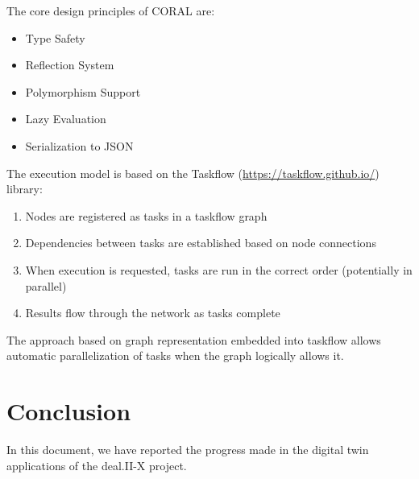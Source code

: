 \documentclass[a4paper,12pt]{article}
\begin{document}
The core design principles of CORAL are:
\begin{itemize}
  \item Type Safety
  \item Reflection System
  \item Polymorphism Support
  \item Lazy Evaluation
  \item Serialization to JSON
\end{itemize}

The execution model is based on the Taskflow (\url{https://taskflow.github.io/}) library:
\begin{enumerate}
  \item Nodes are registered as tasks in a taskflow graph
  \item Dependencies between tasks are established based on node connections
  \item When execution is requested, tasks are run in the correct order (potentially in parallel)
  \item Results flow through the network as tasks complete
\end{enumerate}
The approach based on graph representation embedded into taskflow allows automatic parallelization of tasks when the graph logically allows it.

\newpage

\section{{Conclusion}} \label{sec:conclusion}

In this document, we have reported the progress made in the digital twin applications of the deal.II-X project.




\label{MyLastPage}
\end{document}
